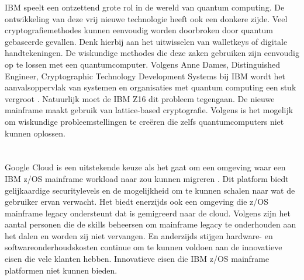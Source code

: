 IBM speelt een ontzettend grote rol in de wereld van quantum computing. De ontwikkeling van deze vrij nieuwe technologie heeft ook een donkere zijde. Veel cryptografiemethodes kunnen eenvoudig worden doorbroken door quantum gebaseerde gevallen. Denk hierbij aan het uitwisselen van walletkeys of digitale handtekeningen. De wiskundige methodes die deze zaken gebruiken zijn eenvoudig op te lossen met een quantumcomputer. Volgens Anne Dames, Distinguished Engineer, Cryptographic Technology Development Systems bij IBM wordt het aanvalsoppervlak van systemen en organisaties met quantum computing een stuk vergroot \autocite{Almekinders2022}. Natuurlijk moet de IBM Z16 dit probleem tegengaan. De nieuwe mainframe maakt gebruik van lattice-based cryptografie. Volgens \textcite{Almerkinders2022} is het mogelijk om wiskundige probleemstellingen te creëren die zelfs quantumcomputers niet kunnen oplossen. 

\section{}
\label{sec:IBM Mainframe modernisatie}


\subsection{}
\label{sec:Workloads migreren naar de cloud}


Google Cloud is een uitstekende keuze als het gaat om een omgeving waar een IBM z/OS mainframe workload naar zou kunnen migreren \autocite{Astadia2021}. Dit platform biedt gelijkaardige securitylevels en de mogelijkheid om te kunnen schalen naar wat de gebruiker ervan verwacht. Het biedt enerzijds ook een omgeving die z/OS mainframe legacy ondersteunt dat is gemigreerd naar de cloud. Volgens \textcite{Astadia2021} zijn het aantal personen die de skills beheersen om mainframe legacy te onderhouden aan het dalen en worden zij niet vervangen. En anderzijds stijgen hardware- en softwareonderhoudskosten continue om te kunnen voldoen aan de innovatieve eisen die vele klanten hebben. Innovatieve eisen die IBM z/OS mainframe platformen niet kunnen bieden. 

\subsection{}
\label{sec:Wat is Astadia?}

